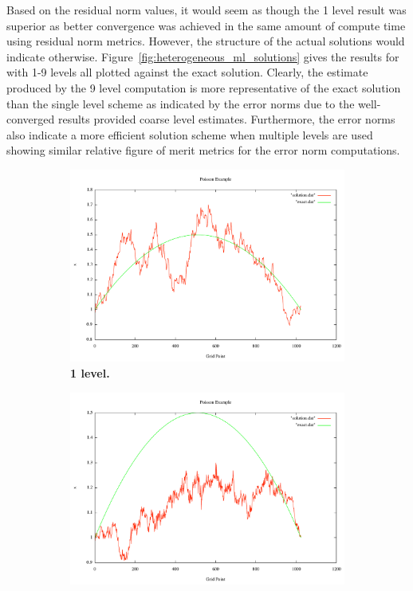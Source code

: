 \documentclass[note]{TechNote}
\begin{document}
Based on the residual norm values, it would seem as though the 1 level
result was superior as better convergence was achieved in the same
amount of compute time using residual norm metrics. However, the
structure of the actual solutions would indicate
otherwise. Figure~\ref{fig:heterogeneous_ml_solutions} gives the
results for with 1-9 levels all plotted against the exact
solution. Clearly, the estimate produced by the 9 level computation is
more representative of the exact solution than the single level scheme
as indicated by the error norms due to the well-converged results
provided coarse level estimates. Furthermore, the error norms also
indicate a more efficient solution scheme when multiple levels are
used showing similar relative figure of merit metrics for the error
norm computations.

\begin{figure}[h!]
  \centering
  \begin{subfigure}[b]{0.32\textwidth}
    \includegraphics[width=\textwidth]{7_sec_1_level.pdf}
    \caption{\textbf{1 level.}}
  \end{subfigure}
  \begin{subfigure}[b]{0.32\textwidth}
    \includegraphics[width=\textwidth]{7_sec_2_level.pdf}

\end{subfigure}
\end{figure}
\end{document}
